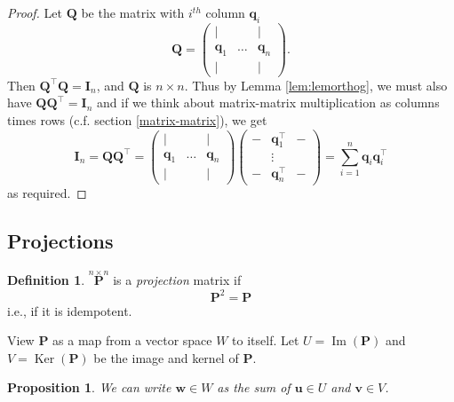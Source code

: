 \documentclass[
]{book}
\newtheorem{proposition}{Proposition}[chapter]
\theoremstyle{definition}
\newtheorem{definition}{Definition}[chapter]
\theoremstyle{definition}
\theoremstyle{definition}
\theoremstyle{definition}
\theoremstyle{remark}
\begin{document}
\begin{proof}
Let \(\mathbf Q\) be the matrix with \(i^{th}\) column \(\mathbf q_i\)
\[\mathbf Q=\left(
    \begin{array}{ccc}
    | &&|\\
    \mathbf q_1& \ldots& \mathbf q_n\\
    | &&|
      \end{array}\right).\]
Then \(\mathbf Q^\top \mathbf Q=\mathbf I_n\), and \(\mathbf Q\) is \(n\times n\). Thus by Lemma \ref{lem:lemorthog}, we must also have \(\mathbf Q\mathbf Q^\top=\mathbf I_n\) and if we think about matrix-matrix multiplication as columns times rows (c.f. section \ref{matrix-matrix}), we get
\[\mathbf I_n=\mathbf Q\mathbf Q^\top=\left(
    \begin{array}{ccc}
    | &&|\\
    \mathbf q_1& \ldots& \mathbf q_n\\
    | &&|
      \end{array}\right) \left(
    \begin{array}{ccc}
    - &\mathbf q_1^\top&-\\
    & \vdots& \\
    - &\mathbf q_n^\top&-
      \end{array}\right) = \sum_{i=1}^n \mathbf q_i \mathbf q_i^\top\]
as required.
\end{proof}

\hypertarget{projection-matrix}{%
\subsection{Projections}\label{projection-matrix}}

\begin{definition}
\protect\hypertarget{def:projection}{}{\label{def:projection} }\(\stackrel{n \times n}{\mathbf P}\) is a \emph{projection}
matrix if
\[\mathbf P^2 =\mathbf P\]
i.e., if it is idempotent.
\end{definition}

View \(\mathbf P\) as a map from a vector space \(W\) to itself. Let \(U=\operatorname{Im}(\mathbf P)\) and \(V=\operatorname{Ker}(\mathbf P)\) be the image and kernel of \(\mathbf P\).

\begin{proposition}
\protect\hypertarget{prp:projec1}{}{\label{prp:projec1} }We can write \(\mathbf w\in W\) as the sum of \(\mathbf u\in U\) and \(\mathbf v\in V\).
\end{proposition}
\end{document}
